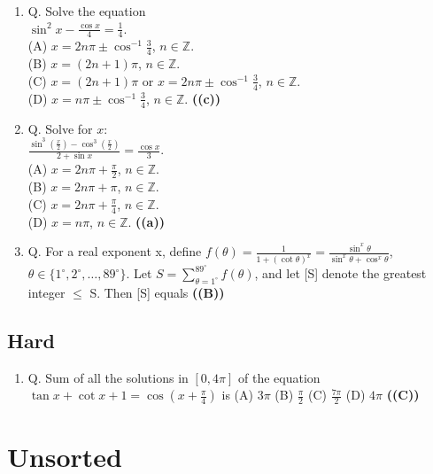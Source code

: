 \documentclass{article}
\begin{document}
\begin{enumerate}
\item Q. Solve the equation \\ $\sin^2 x - \frac{\cos x}{4} = \frac{1}{4}$. \\ (A) $x = 2n\pi \pm \cos^{-1}\frac{3}{4}$, $n \in \mathbb{Z}$. \\ (B) $x = (2n + 1)\pi$, $n \in \mathbb{Z}$. \\ (C) $x = (2n + 1)\pi$ or $x = 2n\pi \pm \cos^{-1}\frac{3}{4}$, $n \in \mathbb{Z}$. \\ (D) $x = n\pi \pm \cos^{-1}\frac{3}{4}$, $n \in \mathbb{Z}$. \hfill \textbf{((c))}
\item Q. Solve for $x$: \\ $\frac{\sin^3\left(\frac{x}{2}\right) - \cos^3\left(\frac{x}{2}\right)}{2 + \sin x} = \frac{\cos x}{3}$. \\ (A) $x = 2n\pi + \frac{\pi}{2}$, $n \in \mathbb{Z}$. \\ (B) $x = 2n\pi + \pi$, $n \in \mathbb{Z}$. \\ (C) $x = 2n\pi + \frac{\pi}{4}$, $n \in \mathbb{Z}$. \\ (D) $x = n\pi$, $n \in \mathbb{Z}$. \hfill \textbf{((a))}
\item Q. For a real exponent x, define $f(\theta) = \frac{1}{1 + (\cot \theta)^x} = \frac{\sin^x \theta}{\sin^x \theta + \cos^x \theta}$, $\theta \in \{1^\circ, 2^\circ, \dots, 89^\circ\}$. Let $S = \sum_{\theta=1^\circ}^{89^\circ} f(\theta)$, and let [S] denote the greatest integer $\leq$ S. Then [S] equals \hfill \textbf{((B))}
\end{enumerate}
\subsection{Hard}
\begin{enumerate}
\item Q. Sum of all the solutions in $[0, 4\pi]$ of the equation $\tan x + \cot x + 1 = \cos(x + \frac{\pi}{4})$ is
(A) $3\pi$
(B) $\frac{\pi}{2}$
(C) $\frac{7\pi}{2}$
(D) $4\pi$ \hfill \textbf{((C))}
\end{enumerate}
\section{Unsorted}
\end{document}
